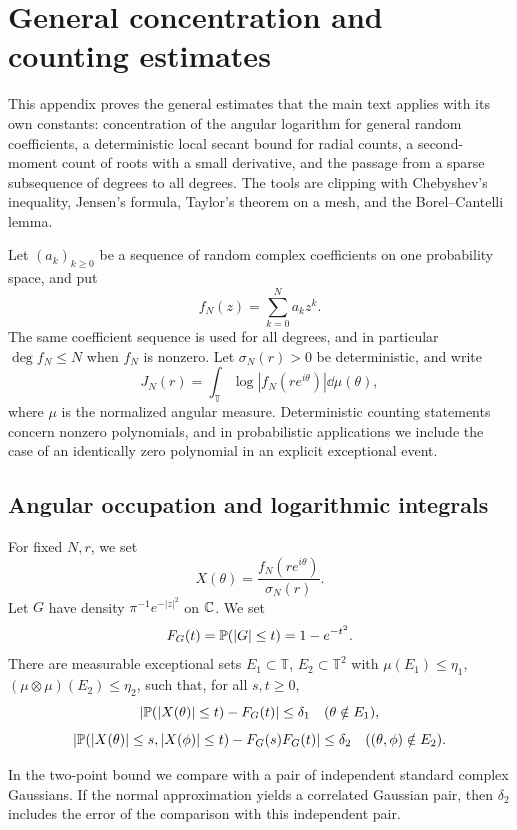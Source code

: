 \section{General concentration and counting estimates}
\label{sec:general-estimates}\label{sec:layer1}
This appendix proves the general estimates that the main text applies
with its own constants: concentration of the angular logarithm for
general random coefficients, a deterministic local secant bound for
radial counts, a second-moment count of roots with a small derivative,
and the passage from a sparse subsequence of degrees to all degrees. The tools are
clipping with Chebyshev's inequality, Jensen's formula, Taylor's theorem
on a mesh, and the Borel--Cantelli lemma.

Let $(a_k)_{k\geq0}$ be a sequence of random complex coefficients on one
probability space, and put
\[
 f_N(z)=\sum_{k=0}^N a_kz^k.
\]
The same coefficient sequence is used for all degrees, and in particular
$\deg f_N\leq N$ when $f_N$ is nonzero.
Let $\sigma_N(r)>0$ be deterministic, and write
\[
 J_N(r)=\int_{\mathbb T}\log|f_N(re^{i\theta})|\dd\mu(\theta),
\]
where $\mu$ is the normalized angular measure. Deterministic counting
statements concern nonzero polynomials, and in probabilistic
applications we include the case of an identically zero polynomial in an
explicit exceptional event.

\subsection{Angular occupation and logarithmic integrals}

\begin{namedhypothesis}\label{hyp:occupation}
For fixed $N,r$, we set
\[
 X(\theta)=\frac{f_N(re^{i\theta})}{\sigma_N(r)}.
\]
Let $G$ have density $\pi^{-1}e^{-|z|^2}$ on $\mathbb C$. We set
\[
 F_G(t)=\mathbb P(|G|\leq t)=1-e^{-t^2}.
\]
There are measurable exceptional sets
$E_1\subset\mathbb T$, $E_2\subset\mathbb T^2$ with
$\mu(E_1)\leq\eta_1$, $(\mu\otimes\mu)(E_2)\leq\eta_2$, such that, for
all $s,t\geq0$,
\[
 \left|\mathbb P(|X(\theta)|\leq t)-F_G(t)\right|\leq\delta_1
       \quad(\theta\notin E_1),
\]
\[
 \left|\mathbb P(|X(\theta)|\leq s,|X(\phi)|\leq t)-F_G(s)F_G(t)\right|
       \leq\delta_2\quad((\theta,\phi)\notin E_2).
\]
\end{namedhypothesis}
In the two-point bound we compare with a pair of independent standard
complex Gaussians. If the normal approximation yields a correlated
Gaussian pair, then $\delta_2$ includes the error of the comparison with
this independent pair.


